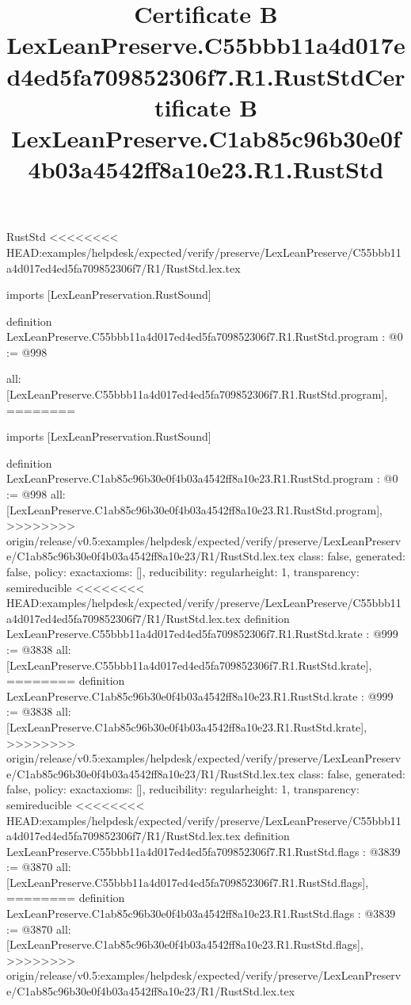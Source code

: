 \begin{lexlean}{RustStd}
<<<<<<<< HEAD:examples/helpdesk/expected/verify/preserve/LexLeanPreserve/C55bbb11a4d017ed4ed5fa709852306f7/R1/RustStd.lex.tex
\title{Certificate B LexLeanPreserve.C55bbb11a4d017ed4ed5fa709852306f7.R1.RustStd}
\begin{coremodule}
imports [LexLeanPreservation.RustSound]

definition LexLeanPreserve.C55bbb11a4d017ed4ed5fa709852306f7.R1.RustStd.program : @0 := @998 {
  all: [LexLeanPreserve.C55bbb11a4d017ed4ed5fa709852306f7.R1.RustStd.program],
========
\title{Certificate B LexLeanPreserve.C1ab85c96b30e0f4b03a4542ff8a10e23.R1.RustStd}
\begin{coremodule}
imports [LexLeanPreservation.RustSound]

definition LexLeanPreserve.C1ab85c96b30e0f4b03a4542ff8a10e23.R1.RustStd.program : @0 := @998 {
  all: [LexLeanPreserve.C1ab85c96b30e0f4b03a4542ff8a10e23.R1.RustStd.program],
>>>>>>>> origin/release/v0.5:examples/helpdesk/expected/verify/preserve/LexLeanPreserve/C1ab85c96b30e0f4b03a4542ff8a10e23/R1/RustStd.lex.tex
  class: false,
  generated: false,
  policy: exact{axioms: []},
  reducibility: regular{height: 1},
  transparency: semireducible
}
<<<<<<<< HEAD:examples/helpdesk/expected/verify/preserve/LexLeanPreserve/C55bbb11a4d017ed4ed5fa709852306f7/R1/RustStd.lex.tex
definition LexLeanPreserve.C55bbb11a4d017ed4ed5fa709852306f7.R1.RustStd.krate : @999 := @3838 {
  all: [LexLeanPreserve.C55bbb11a4d017ed4ed5fa709852306f7.R1.RustStd.krate],
========
definition LexLeanPreserve.C1ab85c96b30e0f4b03a4542ff8a10e23.R1.RustStd.krate : @999 := @3838 {
  all: [LexLeanPreserve.C1ab85c96b30e0f4b03a4542ff8a10e23.R1.RustStd.krate],
>>>>>>>> origin/release/v0.5:examples/helpdesk/expected/verify/preserve/LexLeanPreserve/C1ab85c96b30e0f4b03a4542ff8a10e23/R1/RustStd.lex.tex
  class: false,
  generated: false,
  policy: exact{axioms: []},
  reducibility: regular{height: 1},
  transparency: semireducible
}
<<<<<<<< HEAD:examples/helpdesk/expected/verify/preserve/LexLeanPreserve/C55bbb11a4d017ed4ed5fa709852306f7/R1/RustStd.lex.tex
definition LexLeanPreserve.C55bbb11a4d017ed4ed5fa709852306f7.R1.RustStd.flags : @3839 := @3870 {
  all: [LexLeanPreserve.C55bbb11a4d017ed4ed5fa709852306f7.R1.RustStd.flags],
========
definition LexLeanPreserve.C1ab85c96b30e0f4b03a4542ff8a10e23.R1.RustStd.flags : @3839 := @3870 {
  all: [LexLeanPreserve.C1ab85c96b30e0f4b03a4542ff8a10e23.R1.RustStd.flags],
>>>>>>>> origin/release/v0.5:examples/helpdesk/expected/verify/preserve/LexLeanPreserve/C1ab85c96b30e0f4b03a4542ff8a10e23/R1/RustStd.lex.tex
}}}
\end{coremodule}}
\end{coremodule}
\end{lexlean}
